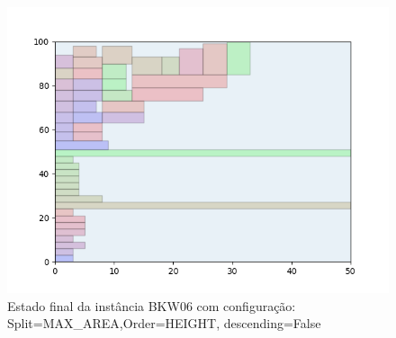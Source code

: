 \begin{figure}[H]
    \centering
    \caption[]{Estado final da instância BKW06 com configuração: Split=MAX_AREA,Order=HEIGHT, descending=False}
    \label{fig:bkw06-max_area-height-false}
    \includegraphics[scale=0.5]{output/figures/bkw/bkw06/max_area/height/false/00}
\end{figure}